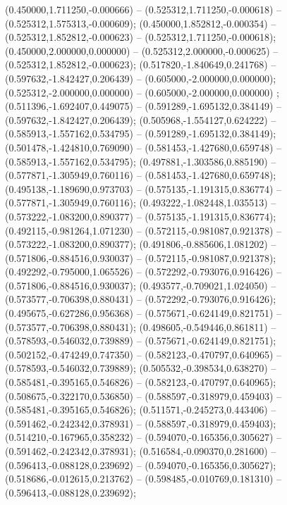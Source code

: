  (0.450000,1.711250,-0.000666) -- (0.525312,1.711250,-0.000618) -- (0.525312,1.575313,-0.000609);
 (0.450000,1.852812,-0.000354) -- (0.525312,1.852812,-0.000623) -- (0.525312,1.711250,-0.000618);
 (0.450000,2.000000,0.000000) -- (0.525312,2.000000,-0.000625) -- (0.525312,1.852812,-0.000623);
 (0.517820,-1.840649,0.241768) -- (0.597632,-1.842427,0.206439) -- (0.605000,-2.000000,0.000000);
 (0.525312,-2.000000,0.000000) -- (0.605000,-2.000000,0.000000) ;
 (0.511396,-1.692407,0.449075) -- (0.591289,-1.695132,0.384149) -- (0.597632,-1.842427,0.206439);
 (0.505968,-1.554127,0.624222) -- (0.585913,-1.557162,0.534795) -- (0.591289,-1.695132,0.384149);
 (0.501478,-1.424810,0.769090) -- (0.581453,-1.427680,0.659748) -- (0.585913,-1.557162,0.534795);
 (0.497881,-1.303586,0.885190) -- (0.577871,-1.305949,0.760116) -- (0.581453,-1.427680,0.659748);
 (0.495138,-1.189690,0.973703) -- (0.575135,-1.191315,0.836774) -- (0.577871,-1.305949,0.760116);
 (0.493222,-1.082448,1.035513) -- (0.573222,-1.083200,0.890377) -- (0.575135,-1.191315,0.836774);
 (0.492115,-0.981264,1.071230) -- (0.572115,-0.981087,0.921378) -- (0.573222,-1.083200,0.890377);
 (0.491806,-0.885606,1.081202) -- (0.571806,-0.884516,0.930037) -- (0.572115,-0.981087,0.921378);
 (0.492292,-0.795000,1.065526) -- (0.572292,-0.793076,0.916426) -- (0.571806,-0.884516,0.930037);
 (0.493577,-0.709021,1.024050) -- (0.573577,-0.706398,0.880431) -- (0.572292,-0.793076,0.916426);
 (0.495675,-0.627286,0.956368) -- (0.575671,-0.624149,0.821751) -- (0.573577,-0.706398,0.880431);
 (0.498605,-0.549446,0.861811) -- (0.578593,-0.546032,0.739889) -- (0.575671,-0.624149,0.821751);
 (0.502152,-0.474249,0.747350) -- (0.582123,-0.470797,0.640965) -- (0.578593,-0.546032,0.739889);
 (0.505532,-0.398534,0.638270) -- (0.585481,-0.395165,0.546826) -- (0.582123,-0.470797,0.640965);
 (0.508675,-0.322170,0.536850) -- (0.588597,-0.318979,0.459403) -- (0.585481,-0.395165,0.546826);
 (0.511571,-0.245273,0.443406) -- (0.591462,-0.242342,0.378931) -- (0.588597,-0.318979,0.459403);
 (0.514210,-0.167965,0.358232) -- (0.594070,-0.165356,0.305627) -- (0.591462,-0.242342,0.378931);
 (0.516584,-0.090370,0.281600) -- (0.596413,-0.088128,0.239692) -- (0.594070,-0.165356,0.305627);
 (0.518686,-0.012615,0.213762) -- (0.598485,-0.010769,0.181310) -- (0.596413,-0.088128,0.239692);
